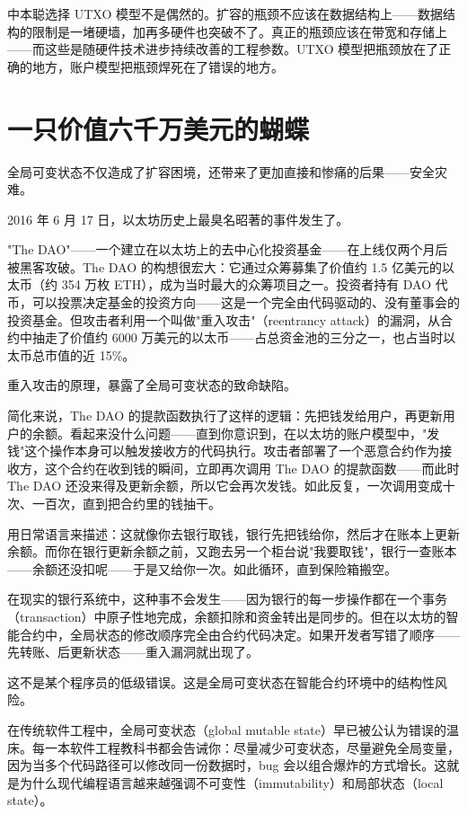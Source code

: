 \documentclass[a4paper,12pt,openany]{ctexbook}
\begin{document}
中本聪选择 UTXO 模型不是偶然的。扩容的瓶颈不应该在数据结构上——数据结构的限制是一堵硬墙，加再多硬件也突破不了。真正的瓶颈应该在带宽和存储上——而这些是随硬件技术进步持续改善的工程参数。UTXO 模型把瓶颈放在了正确的地方，账户模型把瓶颈焊死在了错误的地方。


\section*{一只价值六千万美元的蝴蝶}


全局可变状态不仅造成了扩容困境，还带来了更加直接和惨痛的后果——安全灾难。

2016 年 6 月 17 日，以太坊历史上最臭名昭著的事件发生了。

"The DAO"——一个建立在以太坊上的去中心化投资基金——在上线仅两个月后被黑客攻破。The DAO 的构想很宏大：它通过众筹募集了价值约 1.5 亿美元的以太币（约 354 万枚 ETH），成为当时最大的众筹项目之一。投资者持有 DAO 代币，可以投票决定基金的投资方向——这是一个完全由代码驱动的、没有董事会的投资基金。但攻击者利用一个叫做"重入攻击"（reentrancy attack）的漏洞，从合约中抽走了价值约 6000 万美元的以太币——占总资金池的三分之一，也占当时以太币总市值的近 15\%。

重入攻击的原理，暴露了全局可变状态的致命缺陷。

简化来说，The DAO 的提款函数执行了这样的逻辑：先把钱发给用户，再更新用户的余额。看起来没什么问题——直到你意识到，在以太坊的账户模型中，"发钱"这个操作本身可以触发接收方的代码执行。攻击者部署了一个恶意合约作为接收方，这个合约在收到钱的瞬间，立即再次调用 The DAO 的提款函数——而此时 The DAO 还没来得及更新余额，所以它会再次发钱。如此反复，一次调用变成十次、一百次，直到把合约里的钱抽干。

用日常语言来描述：这就像你去银行取钱，银行先把钱给你，然后才在账本上更新余额。而你在银行更新余额之前，又跑去另一个柜台说"我要取钱"，银行一查账本——余额还没扣呢——于是又给你一次。如此循环，直到保险箱搬空。

在现实的银行系统中，这种事不会发生——因为银行的每一步操作都在一个事务（transaction）中原子性地完成，余额扣除和资金转出是同步的。但在以太坊的智能合约中，全局状态的修改顺序完全由合约代码决定。如果开发者写错了顺序——先转账、后更新状态——重入漏洞就出现了。

这不是某个程序员的低级错误。这是全局可变状态在智能合约环境中的结构性风险。

在传统软件工程中，全局可变状态（global mutable state）早已被公认为错误的温床。每一本软件工程教科书都会告诫你：尽量减少可变状态，尽量避免全局变量，因为当多个代码路径可以修改同一份数据时，bug 会以组合爆炸的方式增长。这就是为什么现代编程语言越来越强调不可变性（immutability）和局部状态（local state）。
\end{document}
